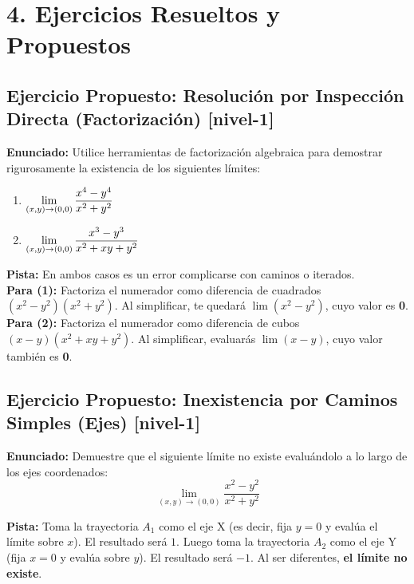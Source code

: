 \documentclass[11pt]{article}
\newenvironment{ejercicios}{%
  \section*{4. Ejercicios Resueltos y Propuestos}%
}{}
\newenvironment{ejerciciopropuesto}[2]{\subsection*{Ejercicio Propuesto: #1 \small{[#2]}}}{}
\newcommand{\enunciado}[1]{\textbf{Enunciado:} #1\par\vspace{0.2cm}}
\newcommand{\pista}[1]{\textbf{Pista:} #1\par\vspace{0.4cm}}
\begin{document}
\begin{ejercicios}
  \begin{ejerciciopropuesto}{Resolución por Inspección Directa (Factorización)}{nivel-1}
    \enunciado{
      Utilice herramientas de factorización algebraica para demostrar rigurosamente la existencia de los siguientes límites:
      \begin{enumerate}
        \item $\displaystyle \displaystyle\lim_{(x,y) \to (0,0)} \dfrac{x^4 - y^4}{x^2 + y^2}$
        \item $\displaystyle \displaystyle\lim_{(x,y) \to (0,0)} \dfrac{x^3 - y^3}{x^2 + xy + y^2}$
      \end{enumerate}
    }
    \pista{
      En ambos casos es un error complicarse con caminos o iterados. \\
      \textbf{Para (1):} Factoriza el numerador como diferencia de cuadrados $(x^2-y^2)(x^2+y^2)$. Al simplificar, te quedará $\displaystyle\lim (x^2-y^2)$, cuyo valor es \textbf{0}. \\
      \textbf{Para (2):} Factoriza el numerador como diferencia de cubos $(x-y)(x^2+xy+y^2)$. Al simplificar, evaluarás $\displaystyle\lim (x-y)$, cuyo valor también es \textbf{0}.
    }
  \end{ejerciciopropuesto}

  \begin{ejerciciopropuesto}{Inexistencia por Caminos Simples (Ejes)}{nivel-1}
    \enunciado{
      Demuestre que el siguiente límite no existe evaluándolo a lo largo de los ejes coordenados:
      $$ \displaystyle\lim_{(x,y) \to (0,0)} \dfrac{x^2 - y^2}{x^2 + y^2} $$
    }
    \pista{
      Toma la trayectoria $A_1$ como el eje X (es decir, fija $y=0$ y evalúa el límite sobre $x$). El resultado será $1$. Luego toma la trayectoria $A_2$ como el eje Y (fija $x=0$ y evalúa sobre $y$). El resultado será $-1$. Al ser diferentes, \textbf{el límite no existe}.
    }
  \end{ejerciciopropuesto}

\end{ejercicios}
\end{document}
